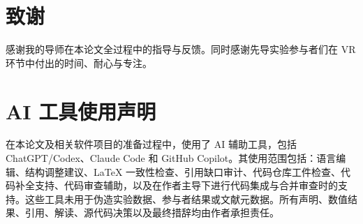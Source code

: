 
\chapter*{致谢}

感谢我的导师在本论文全过程中的指导与反馈。同时感谢先导实验参与者们在 VR 环节中付出的时间、耐心与专注。

\chapter*{AI 工具使用声明}

在本论文及相关软件项目的准备过程中，使用了 AI 辅助工具，包括 ChatGPT/Codex、Claude Code 和 GitHub Copilot。其使用范围包括：语言编辑、结构调整建议、LaTeX 一致性检查、引用缺口审计、代码仓库工件检查、代码补全支持、代码审查辅助，以及在作者主导下进行代码集成与合并审查时的支持。这些工具未用于伪造实验数据、参与者结果或文献元数据。所有声明、数值结果、引用、解读、源代码决策以及最终措辞均由作者承担责任。
